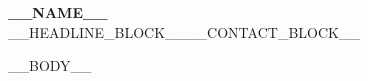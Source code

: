 \documentclass[a4paper,9pt]{extarticle}
\begin{document}
\begin{center}
    {\Huge \scshape \textbf{__NAME__}} \\ \vspace{4pt}
__HEADLINE_BLOCK____CONTACT_BLOCK__\end{center}
\vspace{-4pt}

__BODY__
\end{document}
